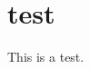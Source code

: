 \documentclass{core/report-template}
\begin{document}

\tableofcontents
\newpage
\section{test}
This is a test.

\end{document}
